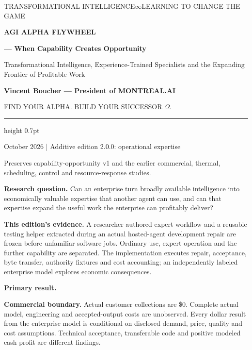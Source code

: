 \documentclass[11pt,letterpaper]{article}
\begin{document}
\thispagestyle{empty}
{\sffamily\small\color{Gold}TRANSFORMATIONAL INTELLIGENCE\quad $\infty$\quad LEARNING TO CHANGE THE GAME}
\vspace{1.0cm}

{\sffamily\bfseries\color{Navy}\fontsize{27}{32}\selectfont AGI ALPHA FLYWHEEL\par}
\vspace{0.25cm}
{\sffamily\bfseries\color{Navy}\fontsize{21}{27}\selectfont --- When Capability Creates Opportunity\par}
\vspace{0.6cm}
{\sffamily\Large Transformational Intelligence, Experience-Trained Specialists and the Expanding Frontier of Profitable Work\par}
\vspace{0.7cm}
{\large\bfseries Vincent Boucher --- President of MONTREAL.AI\par}
\vspace{0.35cm}
{\sffamily\color{Gold}FIND YOUR ALPHA. BUILD YOUR SUCCESSOR $\Omega$.}
\vspace{0.6cm}
\hrule height 0.7pt
\vspace{0.3cm}
{\small{} October 2026 \quad | \quad Additive edition 2.0.0: operational expertise\par}
{\small Preserves capability-opportunity v1 and the earlier commercial, thermal, scheduling, control and resource-response studies.}
\vspace{0.4cm}

\textbf{Research question.} Can an enterprise turn broadly available intelligence into economically valuable expertise that another agent can use, and can that expertise expand the useful work the enterprise can profitably deliver?

\textbf{This edition's evidence.} A researcher-authored expert workflow and a reusable testing helper extracted during an actual hosted-agent development repair are frozen before unfamiliar software jobs. Ordinary use, expert operation and the further capability are separated. The implementation executes repair, acceptance, byte transfer, authority fixtures and cost accounting; an independently labeled enterprise model explores economic consequences.

\textbf{Primary result.} \PilotFinding

\textbf{Commercial boundary.} Actual customer collections are \$0. Complete actual model, engineering and accepted-output costs are unobserved. Every dollar result from the enterprise model is conditional on disclosed demand, price, quality and cost assumptions. Technical acceptance, transferable code and positive modeled cash profit are different findings.
\end{document}

